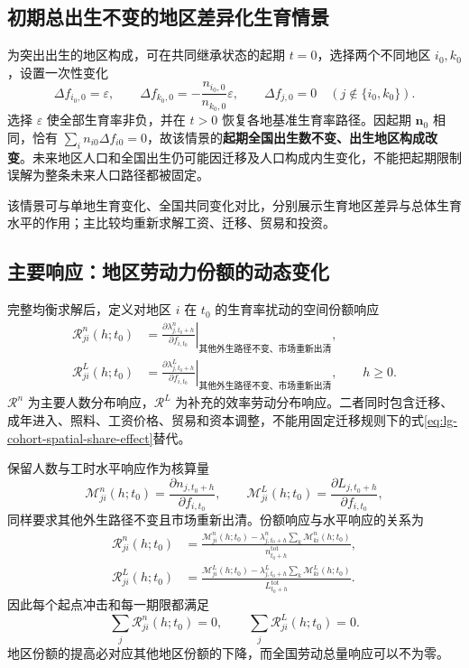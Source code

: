 \documentclass[UTF8,a4paper,zihao=-4,fontset=windows]{ctexart}
\numberwithin{equation}{section}
\begin{document}
\subsection{初期总出生不变的地区差异化生育情景}
为突出出生的地区构成，可在共同继承状态的起期 $t=0$，选择两个不同地区 $i_0,k_0$，设置一次性变化
\begin{equation}
 \Delta f_{i_0,0}=\varepsilon,\qquad
 \Delta f_{k_0,0}=-\frac{n_{i_0,0}}{n_{k_0,0}}\varepsilon,\qquad
 \Delta f_{j,0}=0\quad(j\notin\{i_0,k_0\}).
 \label{eq:lg-birth-neutral-spatial-scenario}
\end{equation}
选择 $\varepsilon$ 使全部生育率非负，并在 $t>0$ 恢复各地基准生育率路径。因起期 $\bm n_0$ 相同，恰有 $\sum_i n_{i0}\Delta f_{i0}=0$，故该情景的\textbf{起期全国出生数不变、出生地区构成改变}。未来地区人口和全国出生仍可能因迁移及人口构成内生变化，不能把起期限制误解为整条未来人口路径都被固定。

该情景可与单地生育变化、全国共同变化对比，分别展示生育地区差异与总体生育水平的作用；主比较均重新求解工资、迁移、贸易和投资。

\subsection{主要响应：地区劳动力份额的动态变化}
完整均衡求解后，定义对地区 $i$ 在 $t_0$ 的生育率扰动的空间份额响应
\begin{align}
 \mathcal R^n_{ji}(h;t_0)&=\left.
 \frac{\partial\lambda^n_{j,t_0+h}}{\partial f_{i,t_0}}
 \right|_{\text{其他外生路径不变、市场重新出清}},\\
 \mathcal R^L_{ji}(h;t_0)&=\left.
 \frac{\partial\lambda^L_{j,t_0+h}}{\partial f_{i,t_0}}
 \right|_{\text{其他外生路径不变、市场重新出清}},\qquad h\geq0.
 \label{eq:lg-ge-spatial-response}
\end{align}
$\mathcal R^n$ 为主要人数分布响应，$\mathcal R^L$ 为补充的效率劳动分布响应。二者同时包含迁移、成年进入、照料、工资价格、贸易和资本调整，不能用固定迁移规则下的式\eqref{eq:lg-cohort-spatial-share-effect}替代。

保留人数与工时水平响应作为核算量
\begin{equation}
 \mathcal M^n_{ji}(h;t_0)=\frac{\partial n_{j,t_0+h}}{\partial f_{i,t_0}},\qquad
 \mathcal M^L_{ji}(h;t_0)=\frac{\partial L_{j,t_0+h}}{\partial f_{i,t_0}},
 \label{eq:lg-ge-labor-multiplier}
\end{equation}
同样要求其他外生路径不变且市场重新出清。份额响应与水平响应的关系为
\begin{align}
 \mathcal R^n_{ji}(h;t_0)&=
 \frac{\mathcal M^n_{ji}(h;t_0)-\lambda^n_{j,t_0+h}\sum_k\mathcal M^n_{ki}(h;t_0)}
 {n_{t_0+h}^{\mathrm{tot}}},\\
 \mathcal R^L_{ji}(h;t_0)&=
 \frac{\mathcal M^L_{ji}(h;t_0)-\lambda^L_{j,t_0+h}\sum_k\mathcal M^L_{ki}(h;t_0)}
 {L_{t_0+h}^{\mathrm{tot}}}.
 \label{eq:lg-response-normalization}
\end{align}
因此每个起点冲击和每一期限都满足
\begin{equation}
 \sum_j\mathcal R^n_{ji}(h;t_0)=0,\qquad
 \sum_j\mathcal R^L_{ji}(h;t_0)=0.
 \label{eq:lg-spatial-response-zero-sum}
\end{equation}
地区份额的提高必对应其他地区份额的下降，而全国劳动总量响应可以不为零。
\end{document}
